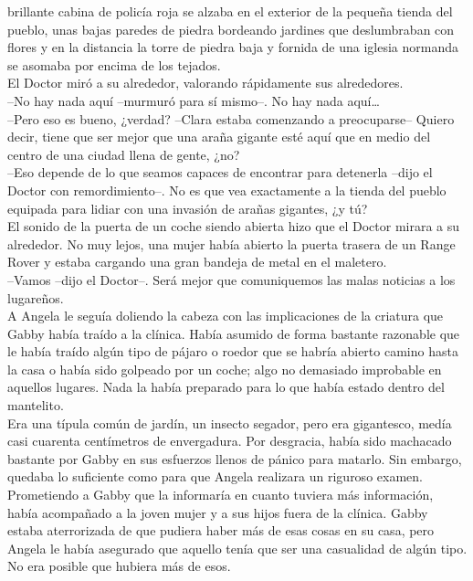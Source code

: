 brillante cabina de policía roja se alzaba en el exterior de la pequeña
tienda del pueblo, unas bajas paredes de piedra bordeando jardines que
deslumbraban con flores y en la distancia la torre de piedra baja y
fornida de una iglesia normanda se asomaba por encima de los tejados.\\
El Doctor miró a su alrededor, valorando rápidamente sus alrededores.\\
--No hay nada aquí --murmuró para sí mismo--. No hay nada aquí\ldots{}\\
--Pero eso es bueno, ¿verdad? --Clara estaba comenzando a preocuparse--
Quiero decir, tiene que ser mejor que una araña gigante esté aquí que en
medio del centro de una ciudad llena de gente, ¿no?\\
--Eso depende de lo que seamos capaces de encontrar para detenerla
--dijo el Doctor con remordimiento--. No es que vea exactamente a la
tienda del pueblo equipada para lidiar con una invasión de arañas
gigantes, ¿y tú?\\
El sonido de la puerta de un coche siendo abierta hizo que el Doctor
mirara a su alrededor. No muy lejos, una mujer había abierto la puerta
trasera de un Range Rover y estaba cargando una gran bandeja de metal en
el maletero.\\
--Vamos --dijo el Doctor--. Será mejor que comuniquemos las malas
noticias a los lugareños.\\[2\baselineskip]A Angela le seguía doliendo
la cabeza con las implicaciones de la criatura que Gabby había traído a
la clínica. Había asumido de forma bastante razonable que le había
traído algún tipo de pájaro o roedor que se habría abierto camino hasta
la casa o había sido golpeado por un coche; algo no demasiado improbable
en aquellos lugares. Nada la había preparado para lo que había estado
dentro del mantelito.\\
Era una típula común de jardín, un insecto segador, pero era gigantesco,
medía casi cuarenta centímetros de envergadura. Por desgracia, había
sido machacado bastante por Gabby en sus esfuerzos llenos de pánico para
matarlo. Sin embargo, quedaba lo suficiente como para que Angela
realizara un riguroso examen.\\
Prometiendo a Gabby que la informaría en cuanto tuviera más información,
había acompañado a la joven mujer y a sus hijos fuera de la clínica.
Gabby estaba aterrorizada de que pudiera haber más de esas cosas en su
casa, pero Angela le había asegurado que aquello tenía que ser una
casualidad de algún tipo. No era posible que hubiera más de esos.\\

